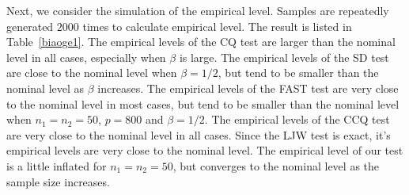 \documentclass[review]{elsarticle}
\theoremstyle{plain}
\theoremstyle{definition}
\theoremstyle{remark}
\begin{document}
Next, we consider the simulation of the empirical level. 
Samples are repeatedly generated $2000$ times to calculate empirical level.
The result is listed in Table~\ref{biaoge1}.
The empirical levels of the CQ test are larger than the nominal level in all cases, especially when $\beta$ is large.
The empirical levels of the SD test are close to the nominal level when $\beta=1/2$, but tend to be smaller than the nominal level as $\beta$ increases.
The empirical levels of the FAST test are very close to the nominal level in most cases, but tend to be smaller than the nominal level when $n_1=n_2=50$, $p=800$ and $\beta=1/2$.
The empirical levels of the CCQ test are very close to the nominal level in all cases.
Since the LJW test is exact, it's empirical levels are very close to the nominal level.
The empirical level of our test is a little inflated for $n_1=n_2=50$, but converges to the nominal level as the sample size increases.
\end{document}
